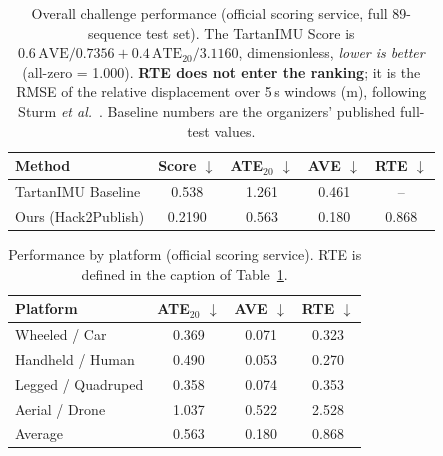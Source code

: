 \begin{table}[htbp]
    \centering\footnotesize
    \caption{Overall challenge performance (official scoring service, full 89-sequence test set). The TartanIMU Score is
    $0.6\,\mathrm{AVE}/0.7356 + 0.4\,\mathrm{ATE}_{20}/3.1160$, dimensionless, \emph{lower is better} (all-zero = 1.000).
    \textbf{RTE does not enter the ranking}; it is the RMSE of the relative displacement over 5\,s windows (m), following
    Sturm \emph{et al.}~\cite{sturm2012rgbd}.
    Baseline numbers are the organizers' published full-test values.}
    \setlength{\tabcolsep}{3.5pt}
    \begin{tabular}{lcccc}
        \toprule Method & Score $\downarrow$ & ATE$_{20}$ $\downarrow$ & AVE $\downarrow$ & RTE $\downarrow$ \\ \midrule
        TartanIMU Baseline & 0.538 & 1.261 & 0.461 & -- \\
        Ours (Hack2Publish) & 0.2190 & 0.563 & 0.180 & 0.868 \\
        \bottomrule
    \end{tabular}
    \label{tab:overall_results}
\end{table}

\begin{table}[htbp]
    \centering\footnotesize
    \caption{Performance by platform (official scoring service). RTE is defined in the caption of Table~\ref{tab:overall_results}.}
    \begin{tabular}{lccc}
        \toprule Platform & ATE$_{20}$ $\downarrow$ & AVE $\downarrow$ & RTE $\downarrow$ \\ \midrule
        Wheeled / Car & 0.369 & 0.071 & 0.323 \\
        Handheld / Human & 0.490 & 0.053 & 0.270 \\
        Legged / Quadruped & 0.358 & 0.074 & 0.353 \\
        Aerial / Drone & 1.037 & 0.522 & 2.528 \\
        \midrule Average & 0.563 & 0.180 & 0.868 \\
        \bottomrule
    \end{tabular}
    \label{tab:platform_results}
\end{table}
